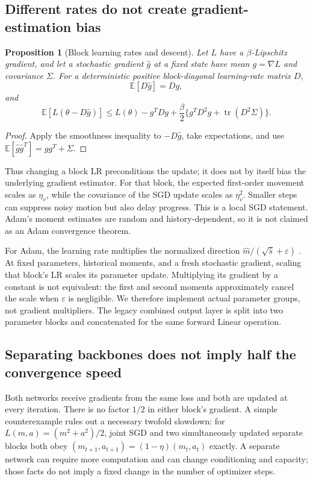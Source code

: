 \documentclass[11pt,a4paper]{article}
\newtheorem{proposition}{Proposition}[section]
\newcommand{\E}{\mathbb E}
\newcommand{\tr}{\operatorname{tr}}
\begin{document}
\subsection{Different rates do not create gradient-estimation bias}
\begin{proposition}[Block learning rates and descent]
Let $L$ have a $\beta$-Lipschitz gradient, and let a stochastic gradient
$\widehat g$ at a fixed state have mean $g=\nabla L$ and covariance $\Sigma$.
For a deterministic positive block-diagonal learning-rate matrix $D$,
\[
 \E[D\widehat g]=Dg,
\]
and
\begin{equation}
 \E[L(\theta-D\widehat g)]\le L(\theta)-g^TDg
 +\frac\beta2\{g^TD^2g+\tr(D^2\Sigma)\}.
 \label{eq:descent}
\end{equation}
\end{proposition}
\begin{proof}
Apply the smoothness inequality to $-D\widehat g$, take expectations, and use
$\E[\widehat g\widehat g^T]=gg^T+\Sigma$.
\end{proof}

Thus changing a block LR preconditions the update; it does not by itself bias
the underlying gradient estimator. For that block, the expected first-order
movement scales as $\eta_v$, while the covariance of the SGD update scales as
$\eta_v^2$. Smaller steps can suppress noisy motion but also delay progress.
This is a local SGD statement. Adam's moment estimates are random and
history-dependent, so it is not claimed as an Adam convergence theorem.

For Adam, the learning rate multiplies the normalized direction
$\widehat m/(\sqrt{\widehat s}+\varepsilon)$ \cite{adam}. At fixed parameters,
historical moments, and a fresh stochastic gradient, scaling that block's LR
scales its parameter update. Multiplying its gradient by a constant is not
equivalent: the first and second moments approximately cancel the scale when
$\varepsilon$ is negligible. We therefore implement actual parameter groups,
not gradient multipliers. The legacy combined output layer is split into two
parameter blocks and concatenated for the same forward Linear operation.

\subsection{Separating backbones does not imply half the convergence speed}
Both networks receive gradients from the same loss and both are updated at
every iteration. There is no factor $1/2$ in either block's gradient. A simple
counterexample rules out a necessary twofold slowdown: for
$L(m,a)=(m^2+a^2)/2$, joint SGD and two simultaneously updated separate
blocks both obey $(m_{t+1},a_{t+1})=(1-\eta)(m_t,a_t)$ exactly. A separate
network can require more computation and can change conditioning and capacity;
those facts do not imply a fixed change in the number of optimizer steps.
\end{document}
